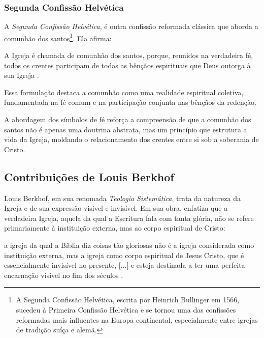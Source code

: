 \subsubsection{Segunda Confissão Helvética}
A \textit{Segunda Confissão Helvética}, é outra confissão reformada clássica que aborda a comunhão dos santos\footnote{A Segunda Confissão Helvética, escrita por Heinrich Bullinger em 1566, sucedeu à Primeira Confissão Helvética e se tornou uma das confissões reformadas mais influentes na Europa continental, especialmente entre igrejas de tradição suíça e alemã.}. Ela afirma:
\begin{citacao}
A Igreja é chamada de comunhão dos santos, porque, reunidos na verdadeira fé, todos os crentes participam de todas as bênçãos espirituais que Deus outorga à sua Igreja \cite{helvetica}.
\end{citacao}

Essa formulação destaca a comunhão como uma realidade espiritual coletiva, fundamentada na fé comum e na participação conjunta nas bênçãos da redenção.

A abordagem dos símbolos de fé reforça a compreensão de que a comunhão dos santos não é apenas uma doutrina abstrata, mas um princípio que estrutura a vida da Igreja, moldando o relacionamento dos crentes entre si sob a soberania de Cristo.

\subsection{Contribuições de Louis Berkhof}

Louis Berkhof, em sua renomada \textit{Teologia Sistemática}, trata da natureza da Igreja e de sua expressão visível e invisível. Em sua obra, enfatiza que a verdadeira Igreja, aquela da qual a Escritura fala com tanta glória, não se refere primariamente à instituição externa, mas ao corpo espiritual de Cristo:

\begin{citacao}
a igreja da qual a Bíblia diz coisas tão gloriosas não é a igreja considerada como instituição externa, mas a igreja como corpo espiritual de Jesus Cristo, que é essencialmente invisível no presente, [...] e esteja destinada a ter uma perfeita encarnação visível no fim dos séculos \cite[p. 644]{berkhof2012}.
\end{citacao}

